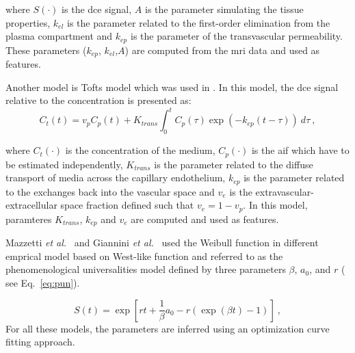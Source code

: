\noindent where $S(\cdot)$ is the \ac{dce} signal, $A$ is the parameter simulating the tissue properties, $k_{el}$ is the parameter related to the first-order elimination from the plasma compartment and $k_{ep}$ is the parameter of the transvascular permeability.
These parameters ($k_{ep}$, $k_{el}$,$A$) are computed from the \ac{mri} data and used as features.

Another model is Tofts model \cite{Tofts1997} which was used in \cite{Langer2009,Giannini2013,Niaf2011,Niaf2012,Mazzetti2011}.
In this model, the \ac{dce} signal relative to the concentration is presented as:
\begin{equation}
	C_t(t) = v_p C_p(t) + K_{trans} \int_{0}^{t} C_p(\tau) \exp( -k_{ep}(t-\tau) ) \ d\tau \ ,
	\label{eq:tofts} 
\end{equation}

\noindent where $C_t(\cdot)$ is the concentration of the medium, $C_p(\cdot)$ is the \ac{aif} which have to be estimated independently, $K_{trans}$ is the parameter related to the diffuse transport of media across the capillary endothelium, $k_{ep}$ is the parameter related to the exchanges back into the vascular space and $v_e$ is the extravascular-extracellular space fraction defined such that $v_e = 1 - v_p$.
In this model, paramteres $K_{trans}$, $k_{ep}$ and $v_e$ are computed and used as features.

Mazzetti \textit{et al.}~\cite{Mazzetti2011} and Giannini \textit{et al.}~\cite{Giannini2013} used the Weibull function in different emprical model based on West-like function and referred to as the phenomenological universalities model \cite{Castorina2006} defined by three parameters $\beta$, $a_{0}$, and $r$ ( see Eq.~\ref{eq:pun}).


\begin{equation}
	S(t) = \exp \left[ r t + \frac{1}{\beta} a_0 - r \left( \exp( \beta t ) - 1 \right) \right] \ ,
	\label{eq:pun}
\end{equation}
\noindent For all these models, the parameters are inferred using an optimization curve fitting approach.


